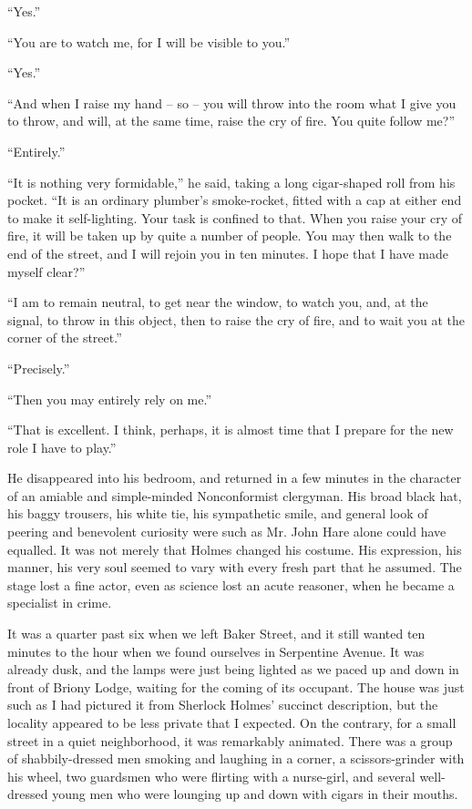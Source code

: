 “Yes.”

“You are to watch me, for I will be visible to you.”

“Yes.”

“And when I raise my hand -- so -- you will throw into the
room what I give you to throw, and will, at the same time,
raise the cry of fire. You quite follow me?”

“Entirely.”

“It is nothing very formidable,” he said, taking a long
cigar-shaped roll from his pocket. “It is an ordinary plumber’s
smoke-rocket, fitted with a cap at either end to make it
self-lighting. Your task is confined to that. When you raise
your cry of fire, it will be taken up by quite a number of people.
You may then walk to the end of the street, and I will
rejoin you in ten minutes. I hope that I have made myself
clear?”

“I am to remain neutral, to get near the window, to watch
you, and, at the signal, to throw in this object, then to raise
the cry of fire, and to wait you at the corner of the street.”

“Precisely.”

“Then you may entirely rely on me.”

“That is excellent. I think, perhaps, it is almost time that
I prepare for the new role I have to play.”

He disappeared into his bedroom, and returned in a few
minutes in the character of an amiable and simple-minded
Nonconformist clergyman. His broad black hat, his baggy
trousers, his white tie, his sympathetic smile, and general
look of peering and benevolent curiosity were such as Mr.
John Hare alone could have equalled. It was not merely
that Holmes changed his costume. His expression, his manner,
his very soul seemed to vary with every fresh part that
he assumed. The stage lost a fine actor, even as science lost
an acute reasoner, when he became a specialist in crime.

It was a quarter past six when we left Baker Street, and it
still wanted ten minutes to the hour when we found ourselves
in Serpentine Avenue. It was already dusk, and the lamps
were just being lighted as we paced up and down in front of
Briony Lodge, waiting for the coming of its occupant. The
house was just such as I had pictured it from Sherlock
Holmes’ succinct description, but the locality appeared to be
less private that I expected. On the contrary, for a small
street in a quiet neighborhood, it was remarkably animated.
There was a group of shabbily-dressed men smoking and
laughing in a corner, a scissors-grinder with his wheel, two
guardsmen who were flirting with a nurse-girl, and several
well-dressed young men who were lounging up and down with
cigars in their mouths.

